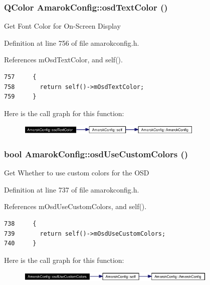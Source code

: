 \subsubsection{\setlength{\rightskip}{0pt plus 5cm}QColor Amarok\-Config::osd\-Text\-Color ()\hspace{0.3cm}{\tt  [inline, static]}}\label{classAmarokConfig_AmarokConfige78}


Get Font Color for On-Screen Display 

Definition at line 756 of file amarokconfig.h.

References m\-Osd\-Text\-Color, and self().



\footnotesize\begin{verbatim}757     {
758       return self()->mOsdTextColor;
759     }
\end{verbatim}\normalsize 


Here is the call graph for this function:\begin{figure}[H]
\begin{center}
\leavevmode
\includegraphics[width=253pt]{classAmarokConfig_AmarokConfige78_cgraph}
\end{center}
\end{figure}
\subsubsection{\setlength{\rightskip}{0pt plus 5cm}bool Amarok\-Config::osd\-Use\-Custom\-Colors ()\hspace{0.3cm}{\tt  [inline, static]}}\label{classAmarokConfig_AmarokConfige76}


Get Whether to use custom colors for the OSD 

Definition at line 737 of file amarokconfig.h.

References m\-Osd\-Use\-Custom\-Colors, and self().



\footnotesize\begin{verbatim}738     {
739       return self()->mOsdUseCustomColors;
740     }
\end{verbatim}\normalsize 


Here is the call graph for this function:\begin{figure}[H]
\begin{center}
\leavevmode
\includegraphics[width=272pt]{classAmarokConfig_AmarokConfige76_cgraph}
\end{center}
\end{figure}
